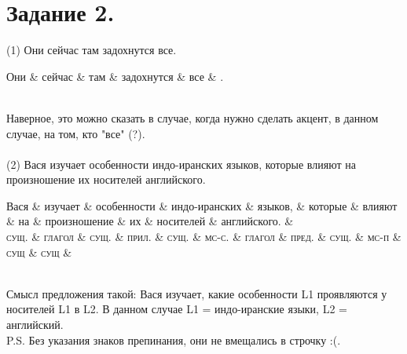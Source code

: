 \documentclass[14pt,extrafontsizes]{article}
\begin{document}
\section*{Задание 2.}
(1) Они сейчас там задохнутся все.
\\
\begin{dependency}[theme = simple]
\begin{deptext}[column sep=1em]
Они \& сейчас \& там \& задохнутся \& все \& .\\
\end{deptext}
\end{dependency}
\\
Наверное, это можно сказать в случае, когда нужно сделать акцент, в данном случае, на том, кто "все" (?).\\ \\
(2) Вася изучает особенности индо-иранских языков, которые влияют на произношение  их носителей английского.\\
\begin{dependency}[theme = simple]
\begin{deptext}
Вася \& изучает \& особенности \& индо-иранских \& языков, \& которые \& влияют \& на \& произношение \& их \& носителей \& английского. \&\\
\textsc{сущ.} \& \textsc{глагол} \& \textsc{сущ.} \& \textsc{прил.} \& \textsc{сущ.} \&  \textsc{мс-с.} \& \textsc{глагол} \& \textsc{пред.} \& \textsc{сущ.} \& \textsc{мс-п} \& \textsc{сущ} \& \textsc{сущ} \&\\
\end{deptext}
\end{dependency}
\\
Смысл предложения такой: Вася изучает, какие особенности L1 проявляются у носителей L1 в L2. В данном случае L1 = индо-иранские языки, L2 = английский.\\
P.S. Без указания знаков препинания, они не вмещались в строчку :(.
\end{document}
